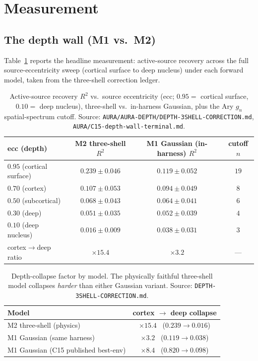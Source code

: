 \documentclass[11pt]{article}
\newcommand{\Rsq}{R^{2}}
\begin{document}
\section{Measurement}
\label{sec:measurement}

\subsection{The depth wall (M1 vs.\ M2)}
\label{sec:depthwall}

Table~\ref{tab:depthwall} reports the headline measurement: active-source recovery
across the full source-eccentricity sweep (cortical surface to deep nucleus) under
each forward model, taken from the three-shell correction ledger.

\begin{table}[h]
\centering
\caption{Active-source recovery $\Rsq$ vs.\ source eccentricity (ecc; $0.95=$
cortical surface, $0.10=$ deep nucleus), three-shell vs.\ in-harness Gaussian, plus
the Ary $g_n$ spatial-spectrum cutoff. Source:
\texttt{AURA/AURA-DEPTH/DEPTH-3SHELL-CORRECTION.md},
\texttt{AURA/C15-depth-wall-terminal.md}.}
\label{tab:depthwall}
\begin{tabular}{lccc}
\toprule
ecc (depth) & M2 three-shell $\Rsq$ & M1 Gaussian (in-harness) $\Rsq$ & cutoff $n$ \\
\midrule
$0.95$ (cortical surface) & $0.239 \pm 0.046$ & $0.119 \pm 0.052$ & $19$ \\
$0.70$ (cortex)           & $0.107 \pm 0.053$ & $0.094 \pm 0.049$ & $8$  \\
$0.50$ (subcortical)      & $0.068 \pm 0.043$ & $0.064 \pm 0.041$ & $6$  \\
$0.30$ (deep)             & $0.051 \pm 0.035$ & $0.052 \pm 0.039$ & $4$  \\
$0.10$ (deep nucleus)     & $\mathbf{0.016 \pm 0.009}$ & $0.038 \pm 0.031$ & $3$ \\
\midrule
cortex$\to$deep ratio & $\mathbf{\times 15.4}$ & $\times 3.2$ & --- \\
\bottomrule
\end{tabular}
\end{table}

\begin{table}[h]
\centering
\caption{Depth-collapse factor by model. The physically faithful three-shell model
collapses \emph{harder} than either Gaussian variant. Source:
\texttt{DEPTH-3SHELL-CORRECTION.md}.}
\label{tab:ratio}
\begin{tabular}{lc}
\toprule
Model & cortex $\to$ deep collapse \\
\midrule
M2 three-shell (physics)            & $\mathbf{\times 15.4}$ \ ($0.239\to0.016$) \\
M1 Gaussian (same harness)          & $\times 3.2$ \ ($0.119\to0.038$) \\
M1 Gaussian (C15 published best-env)& $\times 8.4$ \ ($0.820\to0.098$) \\
\bottomrule
\end{tabular}
\end{table}
\end{document}
